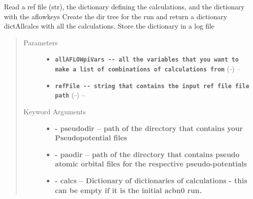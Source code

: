 \documentclass[letterpaper,10pt,english]{sphinxmanual}
\begin{document}
\begin{fulllineitems}
\label{scfuj:scfuj.__oneScfprep}
Read a ref file (str), the dictionary defining the calculations, and the dictionary with the aflowkeys Create the dir
tree for the run and return a dictionary dictAllcalcs with all the calculations. Store the dictionary in a log file
\begin{quote}\begin{description}
\item[{Parameters}] \leavevmode\begin{itemize}
\item {} 
\textbf{\texttt{allAFLOWpiVars -{-} all the variables that you want to make a list of combinations of calculations from}} (\emph{-}) -- 

\item {} 
\textbf{\texttt{refFile    -{-} string that contains the input ref file file path}} (\emph{-}) -- 

\end{itemize}

\item[{Keyword Arguments}] \leavevmode\begin{itemize}
\item {} 
\textbf{- pseudodir  -- path of the directory that contains your Pseudopotential files}

\item {} 
\textbf{- paodir     -- path of the directory that contains pseudo atomic orbital files for the respective pseudo-potentials}

\item {} 
\textbf{- calcs      -- Dictionary of dictionaries of calculations - this can be empty if it is the initial acbn0 run.}

\end{itemize}

\end{description}\end{quote}

\end{fulllineitems}


\begin{fulllineitems}
\label{scfuj:scfuj.acbn0}
\end{fulllineitems}
\end{document}
